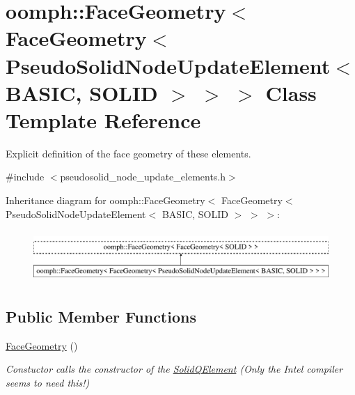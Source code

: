 \hypertarget{classoomph_1_1FaceGeometry_3_01FaceGeometry_3_01PseudoSolidNodeUpdateElement_3_01BASIC_00_01SOLID_01_4_01_4_01_4}{}\section{oomph\+:\+:Face\+Geometry$<$ Face\+Geometry$<$ Pseudo\+Solid\+Node\+Update\+Element$<$ B\+A\+S\+IC, S\+O\+L\+ID $>$ $>$ $>$ Class Template Reference}
\label{classoomph_1_1FaceGeometry_3_01FaceGeometry_3_01PseudoSolidNodeUpdateElement_3_01BASIC_00_01SOLID_01_4_01_4_01_4}


Explicit definition of the face geometry of these elements.  




{\ttfamily \#include $<$pseudosolid\+\_\+node\+\_\+update\+\_\+elements.\+h$>$}

Inheritance diagram for oomph\+:\+:Face\+Geometry$<$ Face\+Geometry$<$ Pseudo\+Solid\+Node\+Update\+Element$<$ B\+A\+S\+IC, S\+O\+L\+ID $>$ $>$ $>$\+:\begin{figure}[H]
\begin{center}
\leavevmode
\includegraphics[height=1.975309cm]{classoomph_1_1FaceGeometry_3_01FaceGeometry_3_01PseudoSolidNodeUpdateElement_3_01BASIC_00_01SOLID_01_4_01_4_01_4}
\end{center}
\end{figure}
\subsection*{Public Member Functions}
\begin{DoxyCompactItemize}
\item 
\hyperlink{classoomph_1_1FaceGeometry_3_01FaceGeometry_3_01PseudoSolidNodeUpdateElement_3_01BASIC_00_01SOLID_01_4_01_4_01_4_a6c8c9148818426e94b61b0f6d22b4c61}{Face\+Geometry} ()
\begin{DoxyCompactList}\small\item\em Constuctor calls the constructor of the \hyperlink{classoomph_1_1SolidQElement}{Solid\+Q\+Element} (Only the Intel compiler seems to need this!) \end{DoxyCompactList}\end{DoxyCompactItemize}


